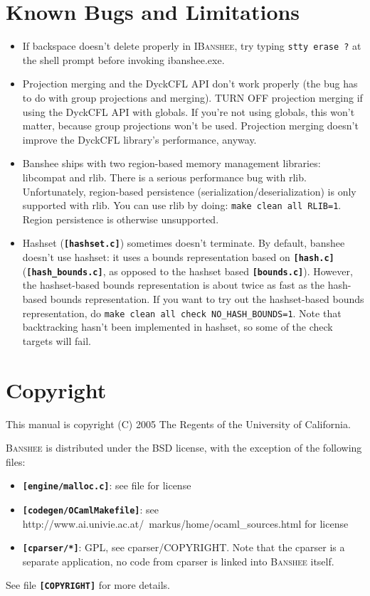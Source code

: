 \documentclass[10pt]{article}
\newcommand{\banshee}{\textsc{Banshee}}
\newcommand{\ibanshee}{\textsc{IBanshee}}
\newcommand{\file}[1]{\texttt{\textbf{[#1]}}}
\begin{document}
\section{Known Bugs and Limitations}
\label{app-bugs}

\begin{itemize}

\item If backspace doesn't delete properly in \ibanshee{}, try typing
  \texttt{stty erase ?} at the shell prompt before invoking
  ibanshee.exe.

\item Projection merging and the DyckCFL API don't work properly (the
  bug has to do with group projections and merging). TURN OFF
  projection merging if using the DyckCFL API with globals. If you're
  not using globals, this won't matter, because group projections
  won't be used. Projection merging doesn't improve the DyckCFL
  library's performance, anyway.

\item Banshee ships with two region-based memory management libraries:
  libcompat and rlib. There is a serious performance bug with
  rlib. Unfortunately, region-based persistence
  (serialization/deserialization) is only supported with rlib. You can
  use rlib by doing: \texttt{make clean all RLIB=1}. Region
  persistence is otherwise unsupported.

\item Hashset (\file{hashset.c}) sometimes doesn't terminate. By
  default, banshee doesn't use hashset: it uses a bounds
  representation based on \file{hash.c} (\file{hash\_bounds.c}, as
  opposed to the hashset based \file{bounds.c}). However, the
  hashset-based bounds representation is about twice as fast as the
  hash-based bounds representation. If you want to try out the
  hashset-based bounds representation, do \texttt{make clean all check
    NO\_HASH\_BOUNDS=1}. Note that backtracking hasn't been
  implemented in hashset, so some of the check targets will fail.
\end{itemize}

\section{Copyright}
\label{app-copyright}

This manual is copyright (C) 2005 The Regents of the University of
California.

\banshee{} is distributed under the BSD license, with the exception of
the following files:

\begin{itemize}
\item \file{engine/malloc.c}: see file for license
\item \file{codegen/OCamlMakefile}: see
  http://www.ai.univie.ac.at/~markus/home/ocaml\_sources.html for
  license
\item \file{cparser/*}: GPL, see cparser/COPYRIGHT. Note that the
  cparser is a separate application, no code from cparser is linked
  into \banshee{} itself.
\end{itemize}

See file \file{COPYRIGHT} for more details.
\end{document}
